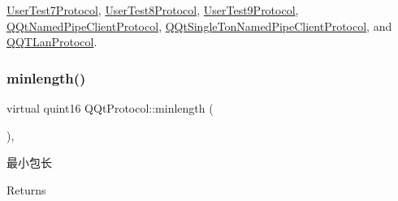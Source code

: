 \mbox{\hyperlink{class_user_test7_protocol_a67a1a31d8896e45be9cbfa83b1282656}{User\+Test7\+Protocol}}, \mbox{\hyperlink{class_user_test8_protocol_a4358fee213c86498f67992fc620c290e}{User\+Test8\+Protocol}}, \mbox{\hyperlink{class_user_test9_protocol_a77d2d555e492aaf2e8cc98b2b16dedd7}{User\+Test9\+Protocol}}, \mbox{\hyperlink{class_q_qt_named_pipe_client_protocol_a79ee5699908d79e62fcb52519ddf79fe}{Q\+Qt\+Named\+Pipe\+Client\+Protocol}}, \mbox{\hyperlink{class_q_qt_single_ton_named_pipe_client_protocol_a22f3540009470dac721de651e9b48adb}{Q\+Qt\+Single\+Ton\+Named\+Pipe\+Client\+Protocol}}, and \mbox{\hyperlink{class_q_q_t_lan_protocol_a05999312ac6df3ce5790d889f2bdc826}{Q\+Q\+T\+Lan\+Protocol}}.

\mbox{\label{class_q_qt_protocol_a2b00f53d3dd0eed817eeecff422891f3}} 
\subsubsection{\texorpdfstring{minlength()}{minlength()}}
{\footnotesize\ttfamily virtual quint16 Q\+Qt\+Protocol\+::minlength (\begin{DoxyParamCaption}{ }\end{DoxyParamCaption})\hspace{0.3cm}{\ttfamily [inline]}, {\ttfamily [virtual]}}



最小包长 

\begin{DoxyReturn}{Returns}

\end{DoxyReturn}


